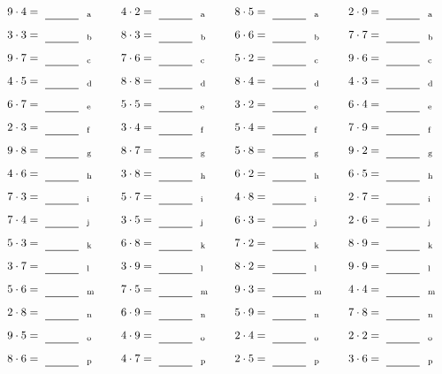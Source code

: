 \documentclass
[
  draft    = true,
  fontsize = 11pt,
  parskip  = half-
]
{scrartcl}
\begin{document}
\par\vfill\par
\begin{align*}
    \pline{9\cdot4}&=\rline{a}
  & \pline{4\cdot2}&=\rline{a}
  & \pline{8\cdot5}&=\rline{a}
  & \pline{2\cdot9}&=\rline{a} \\[1ex]
    \pline{3\cdot3}&=\rline{b}
  & \pline{8\cdot3}&=\rline{b}
  & \pline{6\cdot6}&=\rline{b}
  & \pline{7\cdot7}&=\rline{b} \\[1ex]
    \pline{9\cdot7}&=\rline{c}
  & \pline{7\cdot6}&=\rline{c}
  & \pline{5\cdot2}&=\rline{c}
  & \pline{9\cdot6}&=\rline{c} \\[1ex]
    \pline{4\cdot5}&=\rline{d}
  & \pline{8\cdot8}&=\rline{d}
  & \pline{8\cdot4}&=\rline{d}
  & \pline{4\cdot3}&=\rline{d} \\[1ex]
    \pline{6\cdot7}&=\rline{e}
  & \pline{5\cdot5}&=\rline{e}
  & \pline{3\cdot2}&=\rline{e}
  & \pline{6\cdot4}&=\rline{e} \\[1ex]
    \pline{2\cdot3}&=\rline{f}
  & \pline{3\cdot4}&=\rline{f}
  & \pline{5\cdot4}&=\rline{f}
  & \pline{7\cdot9}&=\rline{f} \\[1ex]
    \pline{9\cdot8}&=\rline{g}
  & \pline{8\cdot7}&=\rline{g}
  & \pline{5\cdot8}&=\rline{g}
  & \pline{9\cdot2}&=\rline{g} \\[1ex]
    \pline{4\cdot6}&=\rline{h}
  & \pline{3\cdot8}&=\rline{h}
  & \pline{6\cdot2}&=\rline{h}
  & \pline{6\cdot5}&=\rline{h} \\[1ex]
    \pline{7\cdot3}&=\rline{i}
  & \pline{5\cdot7}&=\rline{i}
  & \pline{4\cdot8}&=\rline{i}
  & \pline{2\cdot7}&=\rline{i} \\[1ex]
    \pline{7\cdot4}&=\rline{j}
  & \pline{3\cdot5}&=\rline{j}
  & \pline{6\cdot3}&=\rline{j}
  & \pline{2\cdot6}&=\rline{j} \\[1ex]
    \pline{5\cdot3}&=\rline{k}
  & \pline{6\cdot8}&=\rline{k}
  & \pline{7\cdot2}&=\rline{k}
  & \pline{8\cdot9}&=\rline{k} \\[1ex]
    \pline{3\cdot7}&=\rline{l}
  & \pline{3\cdot9}&=\rline{l}
  & \pline{8\cdot2}&=\rline{l}
  & \pline{9\cdot9}&=\rline{l} \\[1ex]
    \pline{5\cdot6}&=\rline{m}
  & \pline{7\cdot5}&=\rline{m}
  & \pline{9\cdot3}&=\rline{m}
  & \pline{4\cdot4}&=\rline{m} \\[1ex]
    \pline{2\cdot8}&=\rline{n}
  & \pline{6\cdot9}&=\rline{n}
  & \pline{5\cdot9}&=\rline{n}
  & \pline{7\cdot8}&=\rline{n} \\[1ex]
    \pline{9\cdot5}&=\rline{o}
  & \pline{4\cdot9}&=\rline{o}
  & \pline{2\cdot4}&=\rline{o}
  & \pline{2\cdot2}&=\rline{o} \\[1ex]
    \pline{8\cdot6}&=\rline{p}
  & \pline{4\cdot7}&=\rline{p}
  & \pline{2\cdot5}&=\rline{p}
  & \pline{3\cdot6}&=\rline{p}
\end{align*}
\end{document}

